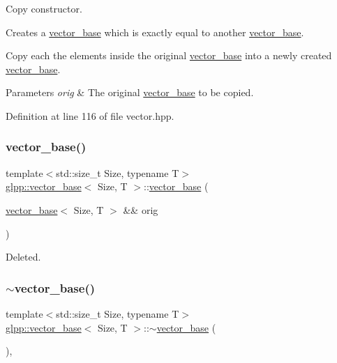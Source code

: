 Copy constructor. 

Creates a \hyperlink{classglpp_1_1vector__base}{vector\+\_\+base} which is exactly equal to another \hyperlink{classglpp_1_1vector__base}{vector\+\_\+base}.

Copy each the elements inside the original \hyperlink{classglpp_1_1vector__base}{vector\+\_\+base} into a newly created \hyperlink{classglpp_1_1vector__base}{vector\+\_\+base}. 


\begin{DoxyParams}{Parameters}
{\em orig} & The original \hyperlink{classglpp_1_1vector__base}{vector\+\_\+base} to be copied. \\
\hline
\end{DoxyParams}


Definition at line 116 of file vector.\+hpp.

\mbox{\label{classglpp_1_1vector__base_af7bae140051531bc4905f8059ca7c22e}} 
\subsubsection{\texorpdfstring{vector\+\_\+base()}{vector\_base()}\hspace{0.1cm}{\footnotesize\ttfamily [3/3]}}
{\footnotesize\ttfamily template$<$std\+::size\+\_\+t Size, typename T$>$ \\
\hyperlink{classglpp_1_1vector__base}{glpp\+::vector\+\_\+base}$<$ Size, T $>$\+::\hyperlink{classglpp_1_1vector__base}{vector\+\_\+base} (\begin{DoxyParamCaption}\item[{\hyperlink{classglpp_1_1vector__base}{vector\+\_\+base}$<$ Size, T $>$ \&\&}]{orig }\end{DoxyParamCaption})\hspace{0.3cm}{\ttfamily [delete]}}

Deleted. \mbox{\label{classglpp_1_1vector__base_aa739db55ea041fd36860393ffa0c0650}} 
\subsubsection{\texorpdfstring{$\sim$vector\+\_\+base()}{~vector\_base()}}
{\footnotesize\ttfamily template$<$std\+::size\+\_\+t Size, typename T$>$ \\
\hyperlink{classglpp_1_1vector__base}{glpp\+::vector\+\_\+base}$<$ Size, T $>$\+::$\sim$\hyperlink{classglpp_1_1vector__base}{vector\+\_\+base} (\begin{DoxyParamCaption}{ }\end{DoxyParamCaption})\hspace{0.3cm}{\ttfamily [inline]}, {\ttfamily [noexcept]}}



